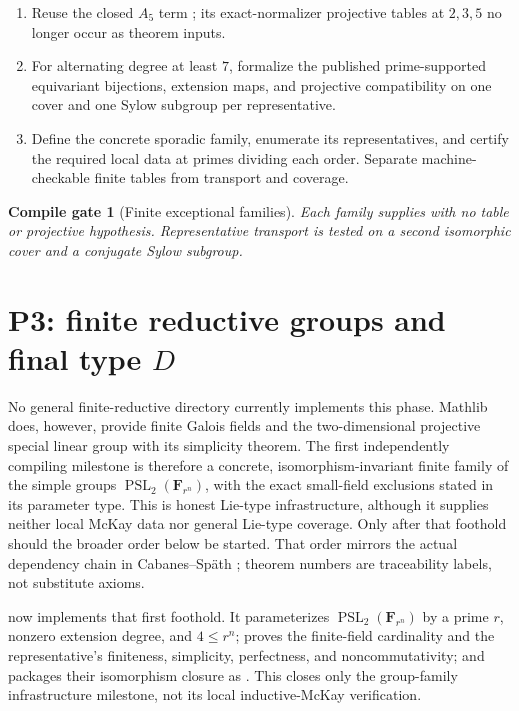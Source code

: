 \documentclass[11pt]{article}
\newtheorem{gate}{Compile gate}
\begin{document}
\begin{enumerate}[label=\textbf{P2.F\arabic*.},leftmargin=*]
  \item Reuse the closed \(A_5\) term
  ; its exact-normalizer
  projective tables at \(2,3,5\) no longer occur as theorem inputs.
  \item For alternating degree at least \(7\), formalize the published
  prime-supported equivariant bijections, extension maps, and projective
  compatibility on one cover and one Sylow subgroup per representative.
  \item Define the concrete sporadic family, enumerate its representatives,
  and certify the required local data at primes dividing each order.
  Separate machine-checkable finite tables from transport and coverage.
\end{enumerate}

\begin{gate}[Finite exceptional families]
Each family supplies
 with no
table or projective hypothesis.  Representative transport is tested on a
second isomorphic cover and a conjugate Sylow subgroup.
\end{gate}

\section{P3: finite reductive groups and final type \(D\)}

No general finite-reductive directory currently implements this phase.
Mathlib does, however, provide finite Galois fields and the
two-dimensional projective special linear group with its simplicity
theorem.  The first
independently compiling milestone is therefore a concrete,
isomorphism-invariant finite family of the simple groups
\(\operatorname{PSL}_2(\mathbf F_{r^n})\), with the exact small-field
exclusions stated in its parameter type.  This is honest Lie-type
infrastructure, although it supplies neither local McKay data nor general
Lie-type coverage.  Only after that foothold should the broader order below
be started.  That order mirrors the actual dependency chain in
Cabanes--Sp\"ath \cite{CabanesSpath2026}; theorem numbers are traceability
labels, not substitute axioms.

 now implements that
first foothold.  It parameterizes
\(\operatorname{PSL}_2(\mathbf F_{r^n})\) by a prime \(r\), nonzero
extension degree, and \(4\leq r^n\); proves the finite-field cardinality
and the representative's finiteness, simplicity, perfectness, and
noncommutativity; and packages their isomorphism closure as
.  This closes only the
group-family infrastructure milestone, not its local inductive-McKay
verification.
\end{document}
